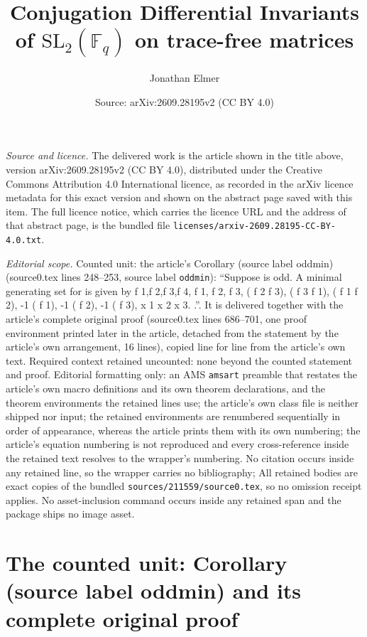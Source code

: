 \documentclass[10pt,a4paper]{amsart}
\title[Conjugation Differential Invariants of $\mathrm{SL}_2(\mathbb{F}_q)$ on trace-free matrices]{Conjugation Differential Invariants of $\mathrm{SL}_2(\mathbb{F}_q)$ on trace-free matrices}
\author{Jonathan Elmer}
\date{Source: arXiv:2609.28195v2 (CC BY 4.0)}
\theoremstyle{plain}
\newtheorem*{Corollary of Conjecture}{Corollary of Conjecture}
\theoremstyle{definition}
\theoremstyle{remark}
\begin{document}
\maketitle

\noindent\emph{Source and licence.} The delivered work is the article shown in the title above, version arXiv:2609.28195v2 (CC BY 4.0), distributed under the Creative Commons Attribution 4.0 International licence, as recorded in the arXiv licence metadata for this exact version and shown on the abstract page saved with this item. The full licence notice, which carries the licence URL and the address of that abstract page, is the bundled file \texttt{licenses/arxiv-2609.28195-CC-BY-4.0.txt}.
\par\smallskip

\noindent\textit{Editorial scope.} Counted unit: the article's Corollary (source label oddmin) (source0.tex lines 248--253, source label \texttt{oddmin}): ``Suppose is odd. A minimal generating set for is given by f 1,f 2,f 3,f 4, f 1, f 2, f 3, ( f 2 f 3), ( f 3 f 1), ( f 1 f 2), -1 ( f 1), -1 ( f 2), -1 ( f 3), x 1 x 2 x 3. .''. It is delivered together with the article's complete original proof (source0.tex lines 686--701, one proof environment printed later in the article, detached from the statement by the article's own arrangement, 16 lines), copied line for line from the article's own text. Required context retained uncounted: none beyond the counted statement and proof. Editorial formatting only: an AMS \texttt{amsart} preamble that restates the article's own macro definitions and its own theorem declarations, and the theorem environments the retained lines use; the article's own class file is neither shipped nor input; the retained environments are renumbered sequentially in order of appearance, whereas the article prints them with its own numbering; the article's equation numbering is not reproduced and every cross-reference inside the retained text resolves to the wrapper's numbering. No citation occurs inside any retained line, so the wrapper carries no bibliography; All retained bodies are exact copies of the bundled \texttt{sources/211559/source0.tex}, so no omission receipt applies. No asset-inclusion command occurs inside any retained span and the package ships no image asset.


\section{The counted unit: Corollary (source label oddmin) and its complete original proof}
\end{document}
